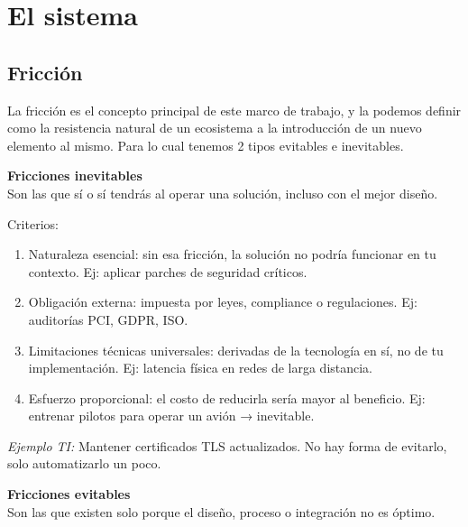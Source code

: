\chapter{El sistema}\label{chap:two}

\section{Fricción}

La fricción es el concepto principal de este marco de trabajo, y la podemos definir como la resistencia natural de un ecosistema a la introducción de un nuevo elemento al mismo. Para lo cual tenemos 2 tipos evitables e inevitables.

\textbf{Fricciones inevitables}\\
Son las que sí o sí tendrás al operar una solución, incluso con el mejor diseño.

Criterios:
\begin{enumerate}
    \item Naturaleza esencial: sin esa fricción, la solución no podría funcionar en tu contexto. Ej: aplicar parches de seguridad críticos.
    \item Obligación externa: impuesta por leyes, compliance o regulaciones. Ej: auditorías PCI, GDPR, ISO.
    \item Limitaciones técnicas universales: derivadas de la tecnología en sí, no de tu implementación. Ej: latencia física en redes de larga distancia.
    \item Esfuerzo proporcional: el costo de reducirla sería mayor al beneficio. Ej: entrenar pilotos para operar un avión → inevitable.
\end{enumerate}

\textit{Ejemplo TI:} Mantener certificados TLS actualizados. No hay forma de evitarlo, solo automatizarlo un poco.

\textbf{Fricciones evitables}\\
Son las que existen solo porque el diseño, proceso o integración no es óptimo.

